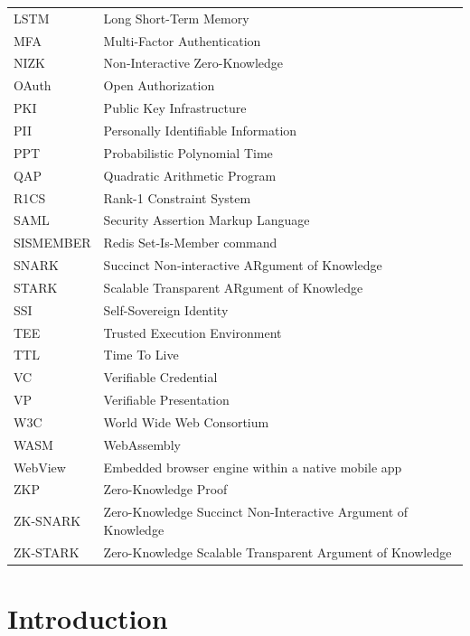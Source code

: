 \documentclass[12pt,a4paper,oneside]{report}
\begin{document}
\begin{longtable}{p{3.5cm} p{10cm}}
LSTM    & Long Short-Term Memory \\
MFA     & Multi-Factor Authentication \\
NIZK    & Non-Interactive Zero-Knowledge \\
OAuth   & Open Authorization \\
PKI     & Public Key Infrastructure \\
PII     & Personally Identifiable Information \\
PPT     & Probabilistic Polynomial Time \\
QAP     & Quadratic Arithmetic Program \\
R1CS    & Rank-1 Constraint System \\
SAML    & Security Assertion Markup Language \\
SISMEMBER & Redis Set-Is-Member command \\
SNARK   & Succinct Non-interactive ARgument of Knowledge \\
STARK   & Scalable Transparent ARgument of Knowledge \\
SSI     & Self-Sovereign Identity \\
TEE     & Trusted Execution Environment \\
TTL     & Time To Live \\
VC      & Verifiable Credential \\
VP      & Verifiable Presentation \\
W3C     & World Wide Web Consortium \\
WASM    & WebAssembly \\
WebView & Embedded browser engine within a native mobile app \\
ZKP     & Zero-Knowledge Proof \\
ZK-SNARK & Zero-Knowledge Succinct Non-Interactive Argument of Knowledge \\
ZK-STARK & Zero-Knowledge Scalable Transparent Argument of Knowledge \\
\bottomrule
\end{longtable}

\clearpage
{}
\setcounter{page}{1}

\chapter{Introduction}
\end{document}
